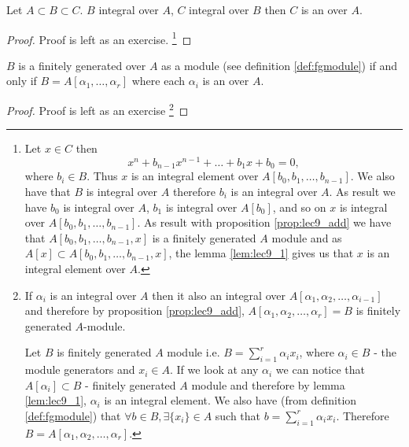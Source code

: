 \begin{proposition}
  Let $A \subset B \subset C$. $B$ integral over $A$, $C$ integral
  over $B$ then $C$ is an  over $A$.
  \begin{proof}
    Proof is left as an exercise.     
    \footnote{
      Let $x \in C$ then
      \[
      x^n + b_{n-1} x^{n-1} + \dots + b_1 x + b_0 = 0,
      \]
      where $b_i \in B$. Thus $x$ is an integral element over
      $A\left[b_0, b_1, \dots, b_{n-1}\right]$. We also have that $B$
      is integral over $A$ therefore $b_i$ is an integral over $A$. As
      result we have $b_0$ is integral over $A$, $b_1$ is integral
      over $A\left[b_0\right]$, and so on $x$ is integral over
       $A\left[b_0, b_1, \dots, b_{n-1}\right]$. As result with
      proposition \ref{prop:lec9_add} we have that
      $A\left[b_0, b_1, \dots, b_{n-1}, x\right]$ is a finitely
      generated $A$ module and as
      $A\left[x\right] \subset A\left[b_0, b_1, \dots, b_{n-1},
        x\right]$, the lemma \ref{lem:lec9_1} gives us that $x$ is an
      integral element over $A$.
    }
  \end{proof}
  \label{prop:lec9_1}
\end{proposition}

\begin{proposition}
  $B$ is a finitely generated over $A$ as a module (see definition
  \ref{def:fgmodule}) if and only if
  $B=A\left[\alpha_1, \dots, \alpha_r\right]$ where each $\alpha_i$ is
  an  over $A$.
  \begin{proof}
    Proof is left as an exercise
    \footnote{
      If $\alpha_i$ is an integral over $A$ then it also an integral
      over $A\left[\alpha_1, \alpha_2, \dots, \alpha_{i-1}\right]$ and
      therefore by proposition \ref{prop:lec9_add},
      $A\left[\alpha_1, \alpha_2, \dots, \alpha_r\right] = B$ is finitely
      generated $A$-module.

      Let $B$ is finitely generated $A$ module i.e.
      $B = \sum_{i=1}^r \alpha_i x_i$, where
      $\alpha_i \in B$ - the module generators and $x_i \in A$.
      If we look at any $\alpha_i$ we can notice that
      $A\left[\alpha_i\right] \subset B$ - finitely generated $A$
      module and therefore by lemma \ref{lem:lec9_1},
      $\alpha_i$ is an integral element. We also have (from definition
      \ref{def:fgmodule}) that $\forall b \in B, \exists \{x_i\} \in
      A$ such that $b = \sum_{i=1}^r \alpha_i x_i$. Therefore
      $B = A\left[\alpha_1, \alpha_2, \dots, \alpha_r\right]$.
    }
  \end{proof}
  \label{prop:lec9_2}
\end{proposition}

